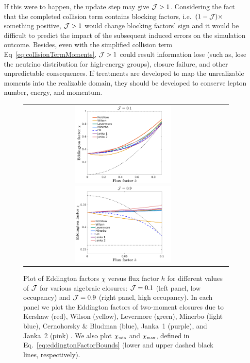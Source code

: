 If this were to happen, the update step may give $\mathcal{J}>1$.
Considering the fact that the completed collision term contains blocking factors, i.e.~$(1-\mathcal{J})\times$ something positive, $\mathcal{J} > 1$ would change blocking factors' sign and it would be difficult to predict the impact of the subsequent induced errors on the simulation outcome.
Besides, even with the simplified collision term Eq~\ref{eq:collisionTermMoments}, $\mathcal{J}>1$ could result information lose (such as, lose the neutrino distribution for high-energy groups), closure failure, and other unpredictable consequences.
If treatments are developed to map the unrealizable moments into the realizable domain, they should be developed to conserve lepton number, energy, and momentum.

\begin{figure}[h]
  \centering
  \begin{tabular}{cc}
    \includegraphics[width=0.5\textwidth]{figures/Closures0_10}
    \includegraphics[width=0.5\textwidth]{figures/Closures0_90}
  \end{tabular}
   \caption{Plot of Eddington factors $\chi$ versus flux factor $h$ for different values of $\mathcal{J}$ for various algebraic closures: $\mathcal{J}=0.1$ (left panel, low occupancy) and $\mathcal{J}=0.9$ (right panel, high occupancy).  In each panel we plot the Eddington factors of two-moment closures due to Kershaw (red), Wilson (yellow), Levermore (green), Minerbo (light blue), Cernohorsky \& Bludman (blue), Janka~1 (purple), and Janka~2 (pink) .  We also plot $\chi_{\mbox{\tiny min}}$ and $\chi_{\mbox{\tiny max}}$, defined in Eq.~\eqref{eq:eddingtonFactorBounds} (lower and upper dashed black lines, respectively).}
  \label{fig:EddingtonFactorsWithDifferentClosure}
\end{figure}